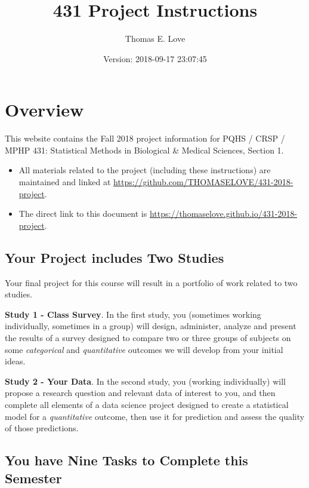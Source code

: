 \documentclass[]{book}
\title{431 Project Instructions}
\author{Thomas E. Love}
\date{Version: 2018-09-17 23:07:45}
\providecommand{\tightlist}{%
  \setlength{\itemsep}{0pt}\setlength{\parskip}{0pt}}
\theoremstyle{definition}
\theoremstyle{definition}
\theoremstyle{definition}
\theoremstyle{remark}
\begin{document}
\maketitle

{
\setcounter{tocdepth}{1}
\tableofcontents
}
\hypertarget{overview}{%
\chapter*{Overview}\label{overview}}

This website contains the Fall 2018 project information for PQHS / CRSP
/ MPHP 431: Statistical Methods in Biological \& Medical Sciences,
Section 1.

\begin{itemize}
\tightlist
\item
  All materials related to the project (including these instructions)
  are maintained and linked at
  \url{https://github.com/THOMASELOVE/431-2018-project}.
\item
  The direct link to this document is
  \url{https://thomaselove.github.io/431-2018-project}.
\end{itemize}

\hypertarget{your-project-includes-two-studies}{%
\section*{Your Project includes Two
Studies}\label{your-project-includes-two-studies}}

Your final project for this course will result in a portfolio of work
related to two studies.

\textbf{Study 1 - Class Survey}. In the first study, you (sometimes
working individually, sometimes in a group) will design, administer,
analyze and present the results of a survey designed to compare two or
three groups of subjects on some \emph{categorical} and
\emph{quantitative} outcomes we will develop from your initial ideas.

\textbf{Study 2 - Your Data}. In the second study, you (working
individually) will propose a research question and relevant data of
interest to you, and then complete all elements of a data science
project designed to create a statistical model for a \emph{quantitative}
outcome, then use it for prediction and assess the quality of those
predictions.

\hypertarget{you-have-nine-tasks-to-complete-this-semester}{%
\section*{You have Nine Tasks to Complete this
Semester}\label{you-have-nine-tasks-to-complete-this-semester}}
\end{document}
